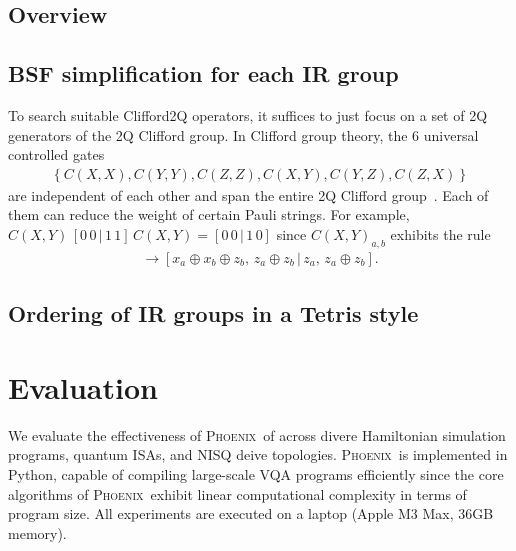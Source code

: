 \documentclass[conference]{IEEEtran}
\newcommand{\phoenix}{\textsc{Phoenix}}
\begin{document}
\subsection{Overview}





\subsection{BSF simplification for each IR group}

    


    To search suitable Clifford2Q operators, it suffices to just focus on a set of 2Q generators of the 2Q Clifford group. In Clifford group theory, the 6 universal controlled gates 
    \begin{align*}
        \left\{ C(X,X), C(Y,Y), C(Z,Z), C(X,Y), C(Y,Z), C(Z,X) \right\}
    \end{align*}
    are independent of each other and span the entire 2Q Clifford group~\cite{grier2022classification}. Each of them can reduce the weight of certain Pauli strings. For example, $C(X,Y)\, [0\, 0\, |\, 1\, 1] \,C(X,Y) = [0\, 0\, |\, 1\, 0] $ since $C(X,Y)_{a,b}$ exhibits the rule
    \begin{align*}
    [x_a,\, x_b\, |\, z_a,\, z_b] \rightarrow [x_a\oplus x_b\oplus z_b,\, z_a\oplus z_b\, |\, z_a,\, z_a\oplus z_b].
    \end{align*}




\subsection{Ordering of IR groups in a Tetris style}





\section{Evaluation}

We evaluate the effectiveness of \phoenix\ of across divere Hamiltonian simulation programs, quantum ISAs, and NISQ deive topologies. \phoenix\ is implemented in Python, capable of compiling large-scale VQA programs efficiently since the core algorithms of \phoenix\ exhibit linear computational complexity in terms of program size. All experiments are executed on a laptop (Apple M3 Max, 36GB memory).
\end{document}

